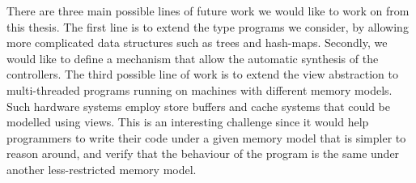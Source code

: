 There are three main possible lines of future work we would like to work on from this thesis. The first line is to
extend the type programs we consider, by allowing more complicated data structures such as trees and hash-maps. Secondly, we would like to define a mechanism that allow the automatic synthesis of the controllers. The third possible line of work is to extend the view abstraction to
multi-threaded programs running on machines with different memory
models. Such hardware systems employ store buffers and cache systems
that could be modelled using views. This is an interesting challenge since it would help programmers to
write their code under a given memory model that is simpler to reason
around, and verify that the behaviour of the program is the same under
another less-restricted memory model.



